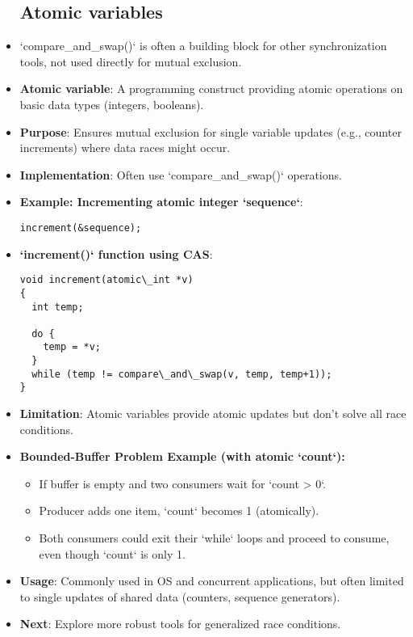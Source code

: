 \begin{itemize}
        \subsection{Atomic variables}
  \item `compare\_and\_swap()` is often a building block for other synchronization tools, not used directly for mutual exclusion.
  \item \textbf{Atomic variable}: A programming construct providing atomic operations on basic data types (integers, booleans).
  \item \textbf{Purpose}: Ensures mutual exclusion for single variable updates (e.g., counter increments) where data races might occur.
  \item \textbf{Implementation}: Often use `compare\_and\_swap()` operations.
  \item \textbf{Example: Incrementing atomic integer `sequence`}:
        \begin{verbatim}
increment(&sequence);
\end{verbatim}
  \item \textbf{`increment()` function using CAS}:
        \begin{verbatim}
void increment(atomic\_int *v)
{
  int temp;
 
  do {
    temp = *v;
  }
  while (temp != compare\_and\_swap(v, temp, temp+1));
}
\end{verbatim}
  \item \textbf{Limitation}: Atomic variables provide atomic updates but don't solve all race conditions.
  \item \textbf{Bounded-Buffer Problem Example (with atomic `count`):}
        \begin{itemize}
          \item If buffer is empty and two consumers wait for `count > 0`.
          \item Producer adds one item, `count` becomes 1 (atomically).
          \item Both consumers could exit their `while` loops and proceed to consume, even
                though `count` is only 1.
        \end{itemize}
  \item \textbf{Usage}: Commonly used in OS and concurrent applications, but often limited to single updates of shared data (counters, sequence generators).
  \item \textbf{Next}: Explore more robust tools for generalized race conditions.
\end{itemize}

